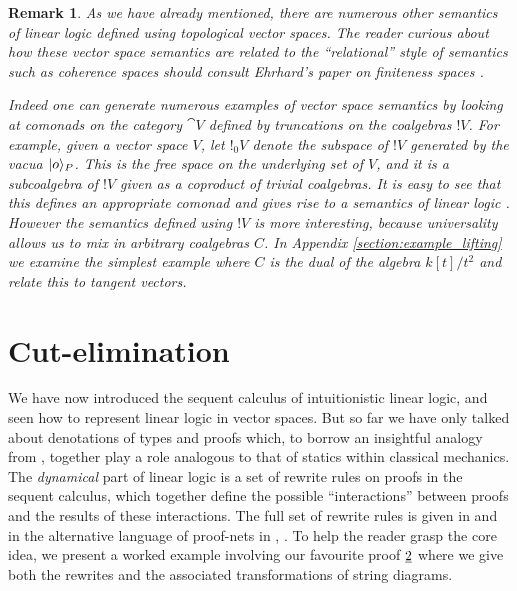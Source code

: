 \documentclass[english,letter paper,12pt,reqno]{article}
\DeclarePairedDelimiter\ket{\lvert}{\rangle}
\theoremstyle{example}
\newtheorem{remark}[theorem]{Remark}
\numberwithin{equation}{section}
\begin{document}
\begin{remark}\label{remark_otherpromotion} As we have already mentioned, there are numerous other semantics of linear logic defined using topological vector spaces. The reader curious about how these vector space semantics are related to the ``relational'' style of semantics such as coherence spaces should consult Ehrhard's paper on finiteness spaces \cite{ehrhard}.

Indeed one can generate numerous examples of vector space semantics by looking at comonads on the category $\cat{V}$ defined by truncations on the coalgebras ${!} V$. For example, given a vector space $V$, let ${!}_0 V$ denote the subspace of ${!} V$ generated by the vacua $\ket{o}_P$. This is the free space on the underlying \emph{set} of $V$, and it is a subcoalgebra of ${!} V$ given as a coproduct of trivial coalgebras. It is easy to see that this defines an appropriate comonad and gives rise to a semantics of linear logic \cite[\S 4.3]{valiron}. However the semantics defined using ${!} V$ is more interesting, because universality allows us to mix in arbitrary coalgebras $C$. In Appendix \ref{section:example_lifting} we examine the simplest example where $C$ is the dual of the algebra $k[t]/t^2$ and relate this to tangent vectors.
\end{remark}

\section{Cut-elimination}\label{section:cut_elim}

We have now introduced the sequent calculus of intuitionistic linear logic, and seen how to represent linear logic in vector spaces. But so far we have only talked about denotations of types and proofs which, to borrow an insightful analogy from \cite[\S III]{girard_towards}, together play a role analogous to that of statics within classical mechanics. The \emph{dynamical} part of linear logic is a set of rewrite rules on proofs in the sequent calculus, which together define the possible ``interactions'' between proofs and the results of these interactions. The full set of rewrite rules is given in \cite[Section 3]{mellies} and in the alternative language of proof-nets in \cite[\S 4]{girard_llogic}, \cite[p.18]{pagani}. To help the reader grasp the core idea, we present a worked example involving our favourite proof $\underline{2}$ where we give both the rewrites and the associated transformations of string diagrams.
\end{document}
